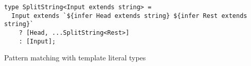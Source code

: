 \begin{listing}[ht]
  \begin{verbatim}
type SplitString<Input extends string> = 
  Input extends `${infer Head extends string} ${infer Rest extends string}`
    ? [Head, ...SplitString<Rest>]
    : [Input];
\end{verbatim}
  \caption{Pattern matching with template literal types}\label{lst:pattern-matching-template-literal}
\end{listing}
